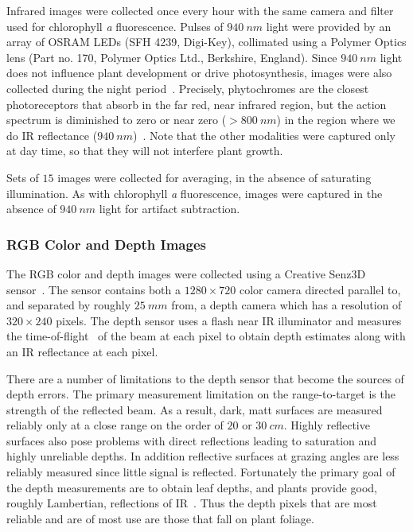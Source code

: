 Infrared images were collected once every hour with the same camera and filter used for chlorophyll {\it a} fluorescence.
Pulses of $940~nm$ light were provided by an array of OSRAM LEDs (SFH 4239, Digi-Key), collimated using a Polymer Optics lens (Part no. 170, Polymer Optics Ltd., Berkshire, England).
Since $940~nm$ light does not influence plant development or drive photosynthesis, images were also collected during the night period~\cite{eskins1992light}.
%
Precisely, phytochromes are the closest photoreceptors that absorb in the far red, near infrared region, but the action spectrum is diminished to zero or near zero ($>800~nm$) in the region where we do IR reflectance ($940~nm$)~\cite{butler1964actton}.
%
Note that the other modalities were captured only at day time, so that they will not interfere plant growth.



Sets of $15$ images were collected for averaging, in the absence of saturating illumination.
As with chlorophyll {\it a} fluorescence, images were captured in the absence of $940~nm$ light for artifact subtraction.



\subsubsection{RGB Color and Depth Images} %

The RGB color and depth images were collected using a Creative Senz3D sensor~\cite{nguyen2015vietnamese}. The sensor contains both a $1280 \times 720$ color camera directed parallel to, and separated by roughly $25~mm$ from, a depth camera which has a resolution of $320\times240$ pixels.
The depth sensor uses a flash near IR illuminator and measures the time-of-flight~\cite{Hansard2013} of the beam at each pixel to obtain depth estimates along with an IR reflectance at each pixel.

There are a number of limitations to the depth sensor that become the sources of depth errors.
The primary measurement limitation on the range-to-target is the strength of the reflected beam.
As a result, dark, matt surfaces are measured reliably only at a close range on the order of $20$ or $30~cm$.
Highly reflective surfaces also pose problems with direct reflections leading to saturation and highly unreliable depths.
In addition reflective surfaces at grazing angles are less reliably measured since little signal is reflected.
Fortunately the primary goal of the depth measurements are to obtain leaf depths, and plants provide good, roughly Lambertian, reflections of IR~\cite{Chelle2006219}.  Thus the depth pixels that are most reliable and are of most use are those that fall on plant foliage.

